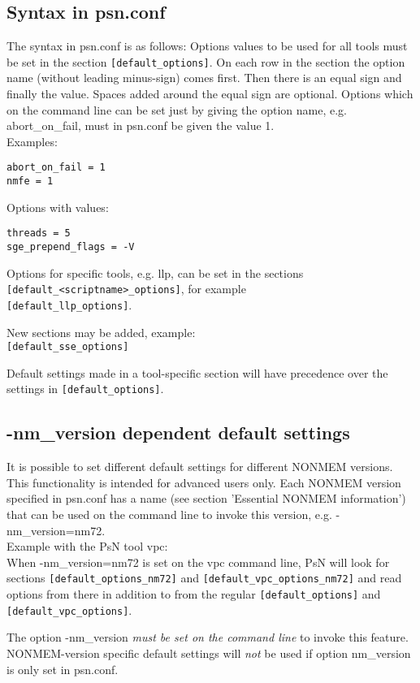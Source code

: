 \subsection {Syntax in psn.conf}
The syntax in psn.conf is as follows: Options values to be used for all tools must be set in the section \verb|[default_options]|. 
On each row in the section the option name (without leading minus-sign) comes first. Then there is an equal sign and finally the value. Spaces added around the equal sign are optional. Options which on the command line can be set just by giving the option name, e.g. abort\_on\_fail, must in psn.conf be given the value 1.\\ Examples:
\begin{verbatim}
abort_on_fail = 1
nmfe = 1
\end{verbatim}
Options with values:
\begin{verbatim}
threads = 5
sge_prepend_flags = -V 
\end{verbatim}
Options for specific tools, e.g. llp, can be set in the sections\\
\verb|[default_<scriptname>_options]|, for example\\
 \verb|[default_llp_options]|.

\noindent New sections may be added, example:\\
\verb|[default_sse_options]|

\noindent Default settings made in a tool-specific section will have precedence over the settings in \verb|[default_options]|.

\subsection{-nm\_version dependent default settings}
It is possible to set different default settings for different NONMEM versions. This functionality is intended for advanced users only. Each NONMEM version specified in psn.conf has a name (see section 'Essential NONMEM information') that can be used on the command line to invoke this version, e.g. -nm\_version=nm72.\\
Example with the PsN tool vpc:\\
When -nm\_version=nm72 is set on the vpc command line, PsN will look for sections \verb|[default_options_nm72]| 
and \verb|[default_vpc_options_nm72]| and read options from there in addition to from the regular \verb|[default_options]| and \verb|[default_vpc_options]|. 

The option -nm\_version \emph{must be set on the command line} to invoke this feature. NONMEM-version specific default settings will \emph{not} be used if option nm\_version is only set in psn.conf.
